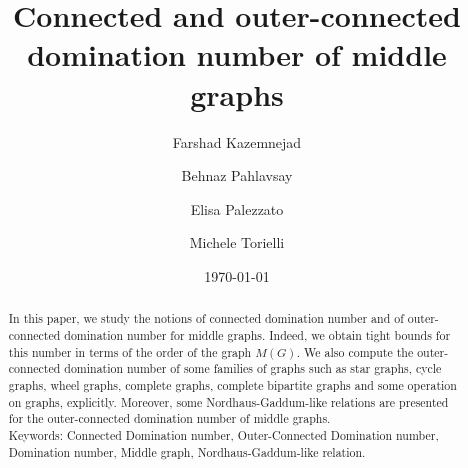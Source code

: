 \documentclass[a4paper,12pt, reqno]{amsart}
\begin{document}
\title{Connected and outer-connected domination number of middle graphs}

\author[F. Kazemnejad]{Farshad Kazemnejad}
\address{Farshad Kazemnejad, Department of Mathematics, School of Sciences, Ilam University, 
P.O.Box 69315-516, Ilam, Iran.}
\author[B. Pahlavsay]{Behnaz Pahlavsay}
\address{Behnaz Pahlavsay, Department of Mathematics, Hokkaido University, Kita 10, Nishi 8, Kita-Ku, Sapporo 060-0810, Japan.}
\author[E. Palezzato]{Elisa Palezzato}
\address{Elisa Palezzato, Department of Mathematics, Hokkaido University, Kita 10, Nishi 8, Kita-Ku, Sapporo 060-0810, Japan.}
\author[M. Torielli]{Michele Torielli}
\address{Michele Torielli, Department of Mathematics, GI-CoRE GSB, Hokkaido University, Kita 10, Nishi 8, Kita-Ku, Sapporo 060-0810, Japan.}



\date{\today}


\begin{abstract}
 In this paper, we study the notions of connected domination number and of outer-connected domination number for middle graphs. Indeed, we obtain tight bounds for this number in terms of the order of the graph $M(G)$. We also compute the outer-connected domination number of some families of graphs such as star graphs, cycle graphs, wheel graphs, complete graphs, complete bipartite graphs and some operation on graphs, explicitly. Moreover, some Nordhaus-Gaddum-like relations are presented for the outer-connected domination number of middle graphs.
\\[0.2em]

\noindent
Keywords: Connected Domination number, Outer-Connected Domination number, Domination number, Middle graph, Nordhaus-Gaddum-like relation.
\\[0.2em]

\noindent 
\end{abstract}
\maketitle
\end{document}
